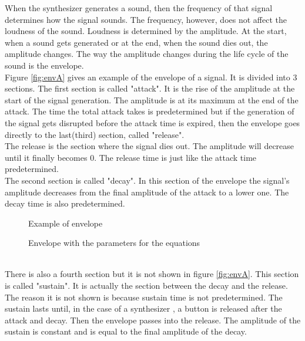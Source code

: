 When the synthesizer generates a sound, then the frequency of that signal determines how the signal sounds. The frequency, however, does not affect the loudness of the sound. Loudness is determined by the amplitude. At the start, when a sound gets generated or at the end, when the sound dies out, the amplitude changes. The way the amplitude changes during the life cycle of the sound is the envelope.\\
Figure \ref{fig:envA} gives an example of the envelope of a signal. It is divided into 3 sections. The first section is called "attack". It is the rise of the amplitude at the start of the signal generation. The amplitude is at its maximum at the end of the attack. The time the total attack takes is predetermined but if the generation of the signal gets disrupted before the attack time is expired, then the envelope goes directly to the last(third) section, called "release".\\
The release is the section where the signal dies out. The amplitude will decrease until it finally becomes 0. The release time is just like the attack time predetermined.\\
The second section is called "decay". In this section of the envelope the signal's amplitude decreases from the final amplitude of the attack to a lower one. The decay time is also predetermined.\\
\begin{figure}[!ht]
  \hfill
  \begin{minipage}[t]{.45\textwidth}
    \begin{center}  
      \caption{Example of envelope}
      \label{fig:envA}
    \end{center}
  \end{minipage}
  \hfill
  \begin{minipage}[t]{.45\textwidth}
    \begin{center}  
      \caption{Envelope with the parameters for the equations}
      \label{fig:envB}
    \end{center}
  \end{minipage}
  \hfill
\end{figure}\\
There is also a fourth section but it is not shown in figure \ref{fig:envA}. This section is called "sustain". It is actually the section between the decay and the release. The reason it is not shown is because sustain time is not predetermined. The sustain lasts until, in the case of a synthesizer , a button is released after the attack and decay. Then the envelope passes into the release. The amplitude of the sustain is constant and is equal to the final amplitude of the decay.
